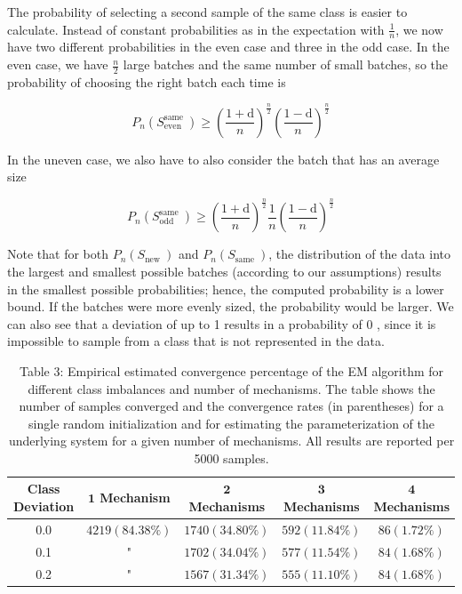 \documentclass[10pt]{article}
\begin{document}
The probability of selecting a second sample of the same class is easier to calculate. Instead of constant probabilities as in the expectation with $\frac{1}{n}$, we now have two different probabilities in the even case and three in the odd case. In the even case, we have $\frac{n}{2}$ large batches and the same number of small batches, so the probability of choosing the right batch each time is

$$
P_{n}\left(S_{\text {even }}^{\text {same }}\right) \geq\left(\frac{1+\mathrm{d}}{n}\right)^{\frac{n}{2}}\left(\frac{1-\mathrm{d}}{n}\right)^{\frac{n}{2}}
$$

In the uneven case, we also have to also consider the batch that has an average size

$$
P_{n}\left(S_{\text {odd }}^{\text {same }}\right) \geq\left(\frac{1+\mathrm{d}}{n}\right)^{\frac{n}{2}} \frac{1}{n}\left(\frac{1-\mathrm{d}}{n}\right)^{\frac{n}{2}}
$$

Note that for both $P_{n}\left(S_{\text {new }}\right)$ and $P_{n}\left(S_{\text {same }}\right)$, the distribution of the data into the largest and smallest possible batches (according to our assumptions) results in the smallest possible probabilities; hence, the computed probability is a lower bound. If the batches were more evenly sized, the probability would be larger. We can also see that a deviation of up to 1 results in a probability of 0 , since it is impossible to sample from a class that is not represented in the data.

\begin{table}[h]
\begin{center}
\begin{tabular}{c|cccc}
Class Deviation & $\mathbf{1}$ Mechanism & $\mathbf{2}$ Mechanisms & $\mathbf{3}$ Mechanisms & $\mathbf{4}$ Mechanisms \\
\hline
0.0 & $4219(84.38 \%)$ & $1740(34.80 \%)$ & $592(11.84 \%)$ & $86(1.72 \%)$ \\
0.1 & " & $1702(34.04 \%)$ & $577(11.54 \%)$ & $84(1.68 \%)$ \\
0.2 & " & $1567(31.34 \%)$ & $555(11.10 \%)$ & $84(1.68 \%)$ \\
\end{tabular}
\captionsetup{labelformat=empty}
\caption{Table 3: Empirical estimated convergence percentage of the EM algorithm for different class imbalances and number of mechanisms. The table shows the number of samples converged and the convergence rates (in parentheses) for a single random initialization and for estimating the parameterization of the underlying system for a given number of mechanisms. All results are reported per 5000 samples.}
\end{center}
\end{table}
\end{document}

